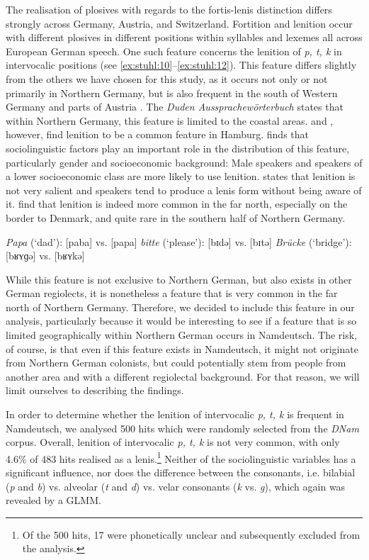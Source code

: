 \documentclass[output=paper]{langsci/langscibook}
\begin{document}
The realisation of plosives with regards to the fortis-lenis distinction differs strongly across Germany, Austria, and Switzerland. Fortition and lenition occur with different plosives in different positions within syllables and lexemes all across European German speech. One such feature concerns the lenition of \textit{p, t, k} in intervocalic positions (see \ref{ex:stuhl:10}--\ref{ex:stuhl:12}). This feature differs slightly from the others we have chosen for this study, as it occurs not only or not primarily in Northern Germany, but is also frequent in the south of Western Germany and parts of Austria \citep[69]{kleiner_duden_2015}. The \textit{Duden Aussprachewörterbuch} states that within Northern Germany, this feature is limited to the coastal areas. \citet[129]{martens_niederdeutsch-bedingte_1988} and \citet{auer_hamburger_1998}, however, find lenition to be a common feature in Hamburg. \citet[194--195]{auer_hamburger_1998} finds that sociolinguistic factors play an important role in the distribution of this feature, particularly gender and socioeconomic background: Male speakers and speakers of a lower socioeconomic class are more likely to use lenition. \citet[384]{scheel_hamburger_1963} states that lenition is not very salient and speakers tend to produce a lenis form without being aware of it. \citet[219]{elmentaler_norddeutscher_2015} find that lenition is indeed more common in the far north, especially on the border to Denmark, and quite rare in the southern half of Northern Germany. 

 
\ea\label{ex:stuhl:10}  
\textit{Papa} (‘dad’): {[paba]} vs. {[papa]}
\ex\label{ex:stuhl:11}  
{\textit{bitte}} (‘please’): {[bɪd{ə}]} vs. {[bɪtə]} 
\ex\label{ex:stuhl:12}    
{\textit{Brücke}} (‘bridge’): {[bʁʏɡə]} vs. {[bʁʏkə]}
\z 
 

 \largerpage
While this feature is not exclusive to Northern German, but also exists in other German regiolects, it is nonetheless a feature that is very common in the far north of Northern Germany. Therefore, we decided to include this feature in our analysis, particularly because it would be interesting to see if a feature that is so limited geographically within Northern German occurs in Namdeutsch. The risk, of course, is that even if this feature exists in Namdeutsch, it might not originate from Northern German colonists, but could potentially stem from people from another area and with a different regiolectal background. For that reason, we will limit ourselves to describing the findings.

In order to determine whether the lenition of intervocalic \textit{p, t, k} is frequent in Namdeutsch, we analysed 500 hits which were randomly selected from the \textit{DNam} corpus. Overall, lenition of intervocalic \textit{p, t, k} is not very common, with only 4.6\% of 483 hits realised as a lenis.\footnote{Of the 500 hits, 17 were phonetically unclear and subsequently excluded from the analysis.} Neither of the sociolinguistic variables has a significant influence, nor does the difference between the consonants, i.e. bilabial (\textit{p} and \textit{b}) vs. alveolar (\textit{t} and \textit{d}) vs. velar consonants (\textit{k} vs. \textit{g}), which again was revealed by a GLMM. 
\clearpage
\end{document}

